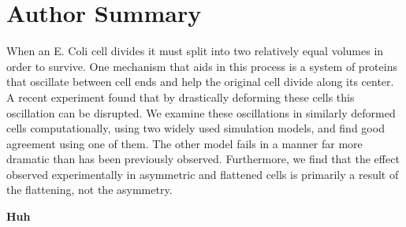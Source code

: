\documentclass[10pt,letterpaper]{article}
\newcommand{\red}[1]{{\bf \color{red} #1}}
\begin{document}
\section*{Author Summary}
  When an E. Coli cell divides it must split into two relatively equal
  volumes in order to survive.  One mechanism that aids in this
  process is a system of proteins that oscillate between cell ends and
  help the original cell divide along its center.  A recent
  experiment found that by drastically deforming these cells this
  oscillation can be disrupted.  We examine these oscillations in
  similarly deformed cells computationally, using two widely used
  simulation models, and find good agreement using one of them.  The
  other model fails in a manner far more dramatic than has been
  previously observed.  Furthermore, we find that the effect observed
  experimentally in asymmetric and flattened cells is primarily a
  result of the flattening, not the asymmetry.

\linenumbers

\red{Huh}
\end{document}
